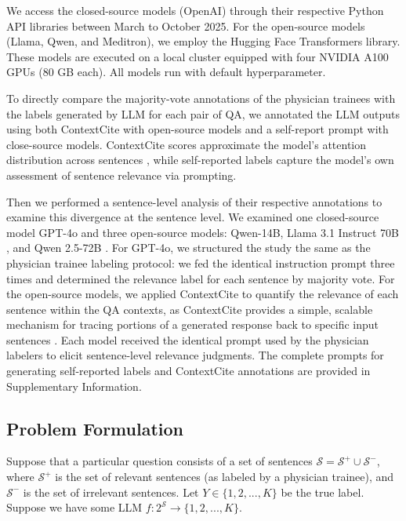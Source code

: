 \documentclass[fleqn,10pt]{wlscirep}
\begin{document}
We access the closed-source models (OpenAI) through their respective Python API libraries between March to October 2025. For the open-source models (Llama, Qwen, and Meditron), we employ the Hugging Face Transformers library. These models are executed on a local cluster equipped with four NVIDIA A100 GPUs (80 GB each). All models run with default hyperparameter.

To directly compare the majority-vote annotations of the physician trainees with the labels generated by LLM for each pair of QA, we annotated the LLM outputs using both ContextCite with open-source models and a self-report prompt with close-source models. ContextCite scores approximate the model’s attention distribution across sentences \cite{bohnet_attributed_2023}, while self-reported labels capture the model’s own assessment of sentence relevance via prompting. 

Then we performed a sentence-level analysis of their respective annotations to examine this divergence at the sentence level. We examined one closed-source model GPT-4o \cite{openai_gpt-4o_2024} and three open-source models: Qwen-14B, Llama 3.1 Instruct 70B \cite{grattafiori_llama_2024}, and Qwen 2.5-72B \cite{qwen_qwen25_2025}. For GPT-4o, we structured the study the same as the physician trainee labeling protocol: we fed the identical instruction prompt three times and determined the relevance label for each sentence by majority vote. For the open-source models, we applied ContextCite to quantify the relevance of each sentence within the QA contexts, as ContextCite provides a simple, scalable mechanism for tracing portions of a generated response back to specific input sentences \cite{cohen-wang_contextcite_2024}. Each model received the identical prompt used by the physician labelers to elicit sentence-level relevance judgments. The complete prompts for generating self-reported labels and ContextCite annotations are provided in Supplementary Information. 

\subsection{Problem Formulation}

Suppose that a particular question consists of a set of sentences $\mathcal{S} = \mathcal{S}^+ \cup \mathcal{S}^-$, where $\mathcal{S}^+$ is the set of relevant sentences (as labeled by a physician trainee), and $\mathcal{S}^-$ is the set of irrelevant sentences. Let $Y \in \{1, 2, ..., K\}$ be the true label. Suppose we have some LLM $f: 2^{\mathcal{S}} \rightarrow \{1, 2, ..., K\}$.
\end{document}

